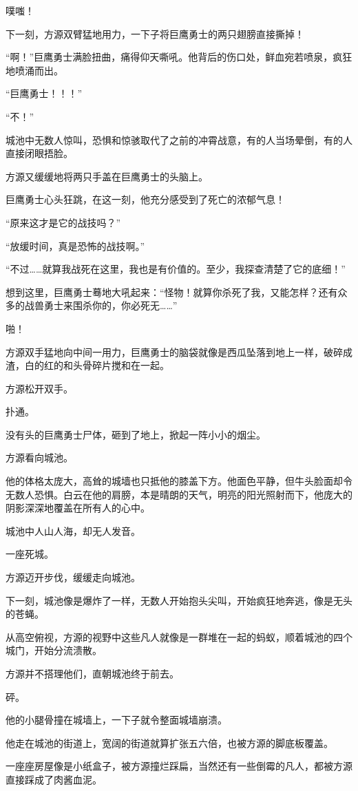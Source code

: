 \begin{this_body}
噗嗤！

下一刻，方源双臂猛地用力，一下子将巨鹰勇士的两只翅膀直接撕掉！

“啊！”巨鹰勇士满脸扭曲，痛得仰天嘶吼。他背后的伤口处，鲜血宛若喷泉，疯狂地喷涌而出。

“巨鹰勇士！！！”

“不！”

城池中无数人惊叫，恐惧和惊骇取代了之前的冲霄战意，有的人当场晕倒，有的人直接闭眼捂脸。

方源又缓缓地将两只手盖在巨鹰勇士的头脑上。

巨鹰勇士心头狂跳，在这一刻，他充分感受到了死亡的浓郁气息！

“原来这才是它的战技吗？”

“放缓时间，真是恐怖的战技啊。”

“不过……就算我战死在这里，我也是有价值的。至少，我探查清楚了它的底细！”

想到这里，巨鹰勇士蓦地大吼起来：“怪物！就算你杀死了我，又能怎样？还有众多的战兽勇士来围杀你的，你必死无……”

啪！

方源双手猛地向中间一用力，巨鹰勇士的脑袋就像是西瓜坠落到地上一样，破碎成渣，白的红的和头骨碎片搅和在一起。

方源松开双手。

扑通。

没有头的巨鹰勇士尸体，砸到了地上，掀起一阵小小的烟尘。

方源看向城池。

他的体格太庞大，高耸的城墙也只抵他的膝盖下方。他面色平静，但牛头脸面却令无数人恐惧。白云在他的肩膀，本是晴朗的天气，明亮的阳光照射而下，他庞大的阴影深深地覆盖在所有人的心中。

城池中人山人海，却无人发音。

一座死城。

方源迈开步伐，缓缓走向城池。

下一刻，城池像是爆炸了一样，无数人开始抱头尖叫，开始疯狂地奔逃，像是无头的苍蝇。

从高空俯视，方源的视野中这些凡人就像是一群堆在一起的蚂蚁，顺着城池的四个城门，开始分流溃散。

方源并不搭理他们，直朝城池终于前去。

砰。

他的小腿骨撞在城墙上，一下子就令整面城墙崩溃。

他走在城池的街道上，宽阔的街道就算扩张五六倍，也被方源的脚底板覆盖。

一座座房屋像是小纸盒子，被方源撞烂踩扁，当然还有一些倒霉的凡人，都被方源直接踩成了肉酱血泥。

\end{this_body}

